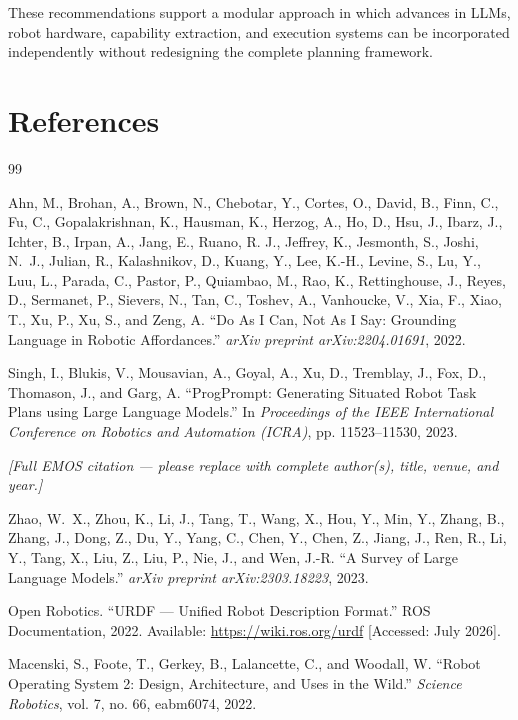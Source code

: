 \documentclass[12pt,a4paper]{article}
\begin{document}
These recommendations support a modular approach in which advances in LLMs, robot hardware, capability extraction, and execution systems can be incorporated independently without redesigning the complete planning framework.

\newpage
\pagestyle{plain}
\section*{References}

\begin{thebibliography}{99}

Ahn, M., Brohan, A., Brown, N., Chebotar, Y., Cortes, O., David, B., Finn, C., Fu, C., Gopalakrishnan, K., Hausman, K., Herzog, A., Ho, D., Hsu, J., Ibarz, J., Ichter, B., Irpan, A., Jang, E., Ruano, R. J., Jeffrey, K., Jesmonth, S., Joshi, N.~J., Julian, R., Kalashnikov, D., Kuang, Y., Lee, K.-H., Levine, S., Lu, Y., Luu, L., Parada, C., Pastor, P., Quiambao, M., Rao, K., Rettinghouse, J., Reyes, D., Sermanet, P., Sievers, N., Tan, C., Toshev, A., Vanhoucke, V., Xia, F., Xiao, T., Xu, P., Xu, S., and Zeng, A.
``Do As I Can, Not As I Say: Grounding Language in Robotic Affordances.''
\textit{arXiv preprint arXiv:2204.01691}, 2022.

Singh, I., Blukis, V., Mousavian, A., Goyal, A., Xu, D., Tremblay, J., Fox, D., Thomason, J., and Garg, A.
``ProgPrompt: Generating Situated Robot Task Plans using Large Language Models.''
In \textit{Proceedings of the IEEE International Conference on Robotics and Automation (ICRA)}, pp. 11523--11530, 2023.

\textit{[Full EMOS citation --- please replace with complete author(s), title, venue, and year.]}

Zhao, W.~X., Zhou, K., Li, J., Tang, T., Wang, X., Hou, Y., Min, Y., Zhang, B., Zhang, J., Dong, Z., Du, Y., Yang, C., Chen, Y., Chen, Z., Jiang, J., Ren, R., Li, Y., Tang, X., Liu, Z., Liu, P., Nie, J., and Wen, J.-R.
``A Survey of Large Language Models.''
\textit{arXiv preprint arXiv:2303.18223}, 2023.

Open Robotics.
``URDF --- Unified Robot Description Format.''
ROS Documentation, 2022. Available: \url{https://wiki.ros.org/urdf} [Accessed: July 2026].

Macenski, S., Foote, T., Gerkey, B., Lalancette, C., and Woodall, W.
``Robot Operating System 2: Design, Architecture, and Uses in the Wild.''
\textit{Science Robotics}, vol. 7, no. 66, eabm6074, 2022.


\end{thebibliography}
\end{document}

